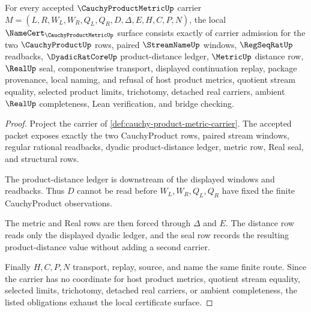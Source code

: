 \begin{theorem}
\label{thm:cauchy-product-metric-namecert-obligations}
For every accepted $\CauchyProductMetricUp$ carrier $M=(L,R,W_L,W_R,Q_L,Q_R,D,\Delta,E,H,C,P,N)$, the local $\NameCert_{\CauchyProductMetricUp}$ surface consists exactly of carrier admission for the two $\CauchyProductUp$ rows, paired $\StreamNameUp$ windows, $\RegSeqRatUp$ readbacks, $\DyadicRatCoreUp$ product-distance ledger, $\MetricUp$ distance row, $\RealUp$ seal, componentwise transport, displayed continuation replay, package provenance, local naming, and refusal of host product metrics, quotient stream equality, selected product limits, trichotomy, detached real carriers, ambient $\RealUp$ completeness, Lean verification, and bridge checking.
\end{theorem}
\begin{proof}
Project the carrier of \autoref{def:cauchy-product-metric-carrier}. The accepted packet exposes exactly the two CauchyProduct rows, paired stream windows, regular rational readbacks, dyadic product-distance ledger, metric row, Real seal, and structural rows.

The product-distance ledger is downstream of the displayed windows and readbacks. Thus $D$ cannot be read before $W_L,W_R,Q_L,Q_R$ have fixed the finite CauchyProduct observations.

The metric and Real rows are then forced through $\Delta$ and $E$. The distance row reads only the displayed dyadic ledger, and the seal row records the resulting product-distance value without adding a second carrier.

Finally $H,C,P,N$ transport, replay, source, and name the same finite route. Since the carrier has no coordinate for host product metrics, quotient stream equality, selected limits, trichotomy, detached real carriers, or ambient completeness, the listed obligations exhaust the local certificate surface.
\end{proof}

